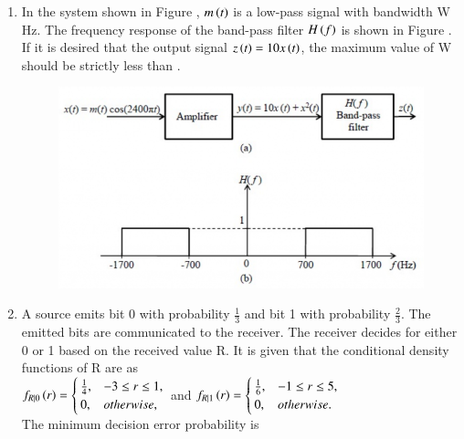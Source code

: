 \documentclass[a4paper, 11pt]{article}
\begin{document}
\begin{enumerate}
    \item In the system shown in Figure , $m\left(t\right)$ is a low-pass signal with bandwidth W Hz. The frequency response of the band-pass filter $H\left(f\right)$ is shown in Figure . If it is desired that the output signal $z\left(t\right)=10x\left(t\right)$, the maximum value of W  should be strictly less than \underline{\hspace{2cm}}.
    \begin{figure}[H]
        \centering
        \includegraphics[width=0.8\columnwidth]{figs/q61.png}
        \caption*{}
        \label{fig:q61}
    \end{figure}
    
    \hfill{}

    \item A source emits bit 0 with probability $\frac{1}{3}$ and bit 1 with probability $\frac{2}{3}$. The emitted bits are communicated to the receiver. The receiver decides for either 0 or 1 based on the received value R. It is given that the conditional density functions of R are as\\$f_{R|0}\left(r\right)=\begin{cases}\frac{1}{4}, & -3\le r\le1,\\ 0, & otherwise,\end{cases}$ and $f_{R|1}\left(r\right)=\begin{cases}\frac{1}{6}, & -1\le r\le5,\\ 0, & otherwise.\end{cases}$\\The minimum decision error probability is
    \begin{enumerate}
    \end{enumerate}
    

\end{enumerate}
\end{document}
